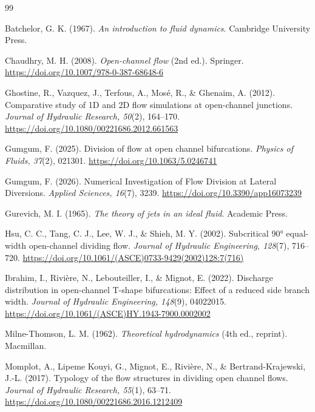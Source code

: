 \begin{thebibliography}{99}

Batchelor, G. K. (1967). \emph{An introduction to fluid dynamics}. Cambridge University Press.

Chaudhry, M. H. (2008). \emph{Open-channel flow} (2nd ed.). Springer. \url{https://doi.org/10.1007/978-0-387-68648-6}

Ghostine, R., Vazquez, J., Terfous, A., Mosé, R., \& Ghenaim, A. (2012). Comparative study of 1D and 2D flow simulations at open-channel junctions. \emph{Journal of Hydraulic Research, 50}(2), 164--170. \url{https://doi.org/10.1080/00221686.2012.661563}

Gumgum, F. (2025). Division of flow at open channel bifurcations. \emph{Physics of Fluids, 37}(2), 021301. \url{https://doi.org/10.1063/5.0246741}

Gumgum, F. (2026). Numerical Investigation of Flow Division at Lateral Diversions. \emph{Applied Sciences, 16}(7), 3239. \url{https://doi.org/10.3390/app16073239}

Gurevich, M. I. (1965). \emph{The theory of jets in an ideal fluid}. Academic Press.

Hsu, C. C., Tang, C. J., Lee, W. J., \& Shieh, M. Y. (2002). Subcritical 90° equal-width open-channel dividing flow. \emph{Journal of Hydraulic Engineering, 128}(7), 716--720. \url{https://doi.org/10.1061/(ASCE)0733-9429(2002)128:7(716)}

Ibrahim, I., Rivière, N., Lebouteiller, I., \& Mignot, E. (2022). Discharge distribution in open-channel T-shape bifurcations: Effect of a reduced side branch width. \emph{Journal of Hydraulic Engineering, 148}(9), 04022015. \url{https://doi.org/10.1061/(ASCE)HY.1943-7900.0002002}

Milne-Thomson, L. M. (1962). \emph{Theoretical hydrodynamics} (4th ed., reprint). Macmillan.

Momplot, A., Lipeme Kouyi, G., Mignot, E., Rivière, N., \& Bertrand-Krajewski, J.-L. (2017). Typology of the flow structures in dividing open channel flows. \emph{Journal of Hydraulic Research, 55}(1), 63--71. \url{https://doi.org/10.1080/00221686.2016.1212409}


\end{thebibliography}
